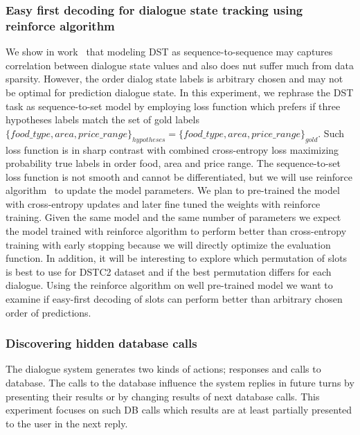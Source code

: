 \documentclass[11pt]{article}
\begin{document}
\subsubsection*{Easy first decoding for dialogue state tracking using reinforce algorithm}
We show in work~\cite{platek_recurrent_2016} that modeling DST as sequence-to-sequence may captures correlation between dialogue state values and also does nut suffer much from data sparsity.
However, the order dialog state labels is arbitrary chosen and may not be optimal for prediction dialogue state.
In this experiment, we rephrase the DST task as sequence-to-set model by employing loss function which prefers if three hypotheses labels match the set of gold labels $\{food\_type, area, price\_range\}_{hypotheses} = \{food\_type, area, price\_range\}_{gold}$.
Such loss function is in sharp contrast with combined cross-entropy loss maximizing probability true labels in order food, area and price range.
The sequence-to-set loss function is not smooth and cannot be differentiated, but we will use reinforce algorithm~\cite{williams_simple_1992} to update the model parameters.
We plan to pre-trained the model with cross-entropy updates and later fine tuned the weights with reinforce training.
Given the same model and the same number of parameters we expect the model trained with reinforce algorithm to perform better than cross-entropy training with early stopping because we will directly optimize the evaluation function.
In addition, it will be interesting to explore which permutation of slots is best to use for DSTC2 dataset and if the best permutation differs for each dialogue.
Using the reinforce algorithm on well pre-trained model we want to examine if easy-first decoding of slots can perform better than arbitrary chosen order of predictions. 

\subsubsection*{Discovering hidden database calls}
The dialogue system generates two kinds of actions; responses and calls to database.
The calls to the database influence the system replies in future turns by presenting their results or by changing results of next database calls.
This experiment focuses on such DB calls which results are at least partially presented to the user in the next reply.
\end{document}
